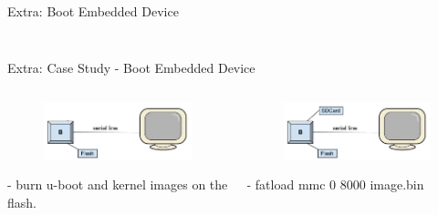 \documentclass{workshop}
\begin{document}
\begin{frame}{Extra: Boot Embedded Device}
\begin{columns}
\begin{column}[l]{0.45\textwidth}
\begin{figure}
      \end{figure}
    \end{column}
  \end{columns}
\end{frame}

\begin{frame}{Extra: Case Study - Boot Embedded Device}
  \begin{columns}
    \begin{column}[l]{0.45\textwidth}
      \begin{figure}
         \includegraphics[scale=0.17]{img/flash.png}
      \end{figure}
      \begin{center}
        \tiny{- burn u-boot and kernel images on the flash.}
      \end{center}
    \end{column}
    \pause
    \begin{column}[l]{0.45\textwidth}
      \begin{figure}
         \includegraphics[scale=0.17]{img/sdcard.png}
      \end{figure}
      \begin{center}
        \tiny{- fatload mmc 0 8000 image.bin}
      \end{center}
    \end{column}
  \end{columns}
     \pause
     \begin{figure}

\end{figure}
\end{frame}
\end{document}
